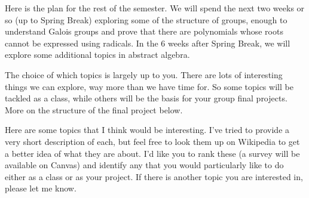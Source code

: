 \documentclass[10pt,letterpaper]{article}
\begin{document}
Here is the plan for the rest of the semester.  We will spend the next two weeks or so (up to Spring Break) exploring some of the structure of groups, enough to understand Galois groups and prove that there are polynomials whose roots cannot be expressed using radicals.  In the 6 weeks after Spring Break, we will explore some additional topics in abstract algebra.  

The choice of which topics is largely up to you.  There are lots of interesting things we can explore, way more than we have time for.  So some topics will be tackled as a class, while others will be the basis for your group final projects.  More on the structure of the final project below.

Here are some topics that I think would be interesting.  I've tried to provide a very short description of each, but feel free to look them up on Wikipedia to get a better idea of what they are about.  I'd like you to rank these (a survey will be available on Canvas) and identify any that you would particularly like to do either as a class or as your project.  If there is another topic you are interested in, please let me know.
\end{document}
